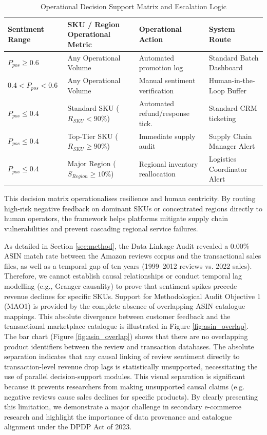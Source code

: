 \documentclass[authoryear,review,3p,times,12pt]{elsarticle}
\begin{document}
\begin{landscape}
\begin{table}
\centering
\renewcommand{\arraystretch}{1.15}
\caption{Operational Decision Support Matrix and Escalation Logic}
\label{tab:decision_matrix}
\begin{tabular}{llll}
\hline
\textbf{Sentiment Range} & \textbf{SKU / Region Operational Metric} & \textbf{Operational Action}     & \textbf{System Route}       \\ \hline
$P_{pos} \ge 0.6$     & Any Operational Volume          & Automated promotion log       & Standard Batch Dashboard   \\
$0.4 < P_{pos} < 0.6$ & Any Operational Volume          & Manual sentiment verification & Human-in-the-Loop Buffer   \\
$P_{pos} \le 0.4$         & Standard SKU ($R_{SKU} < 90\%$)       & Automated refund/response tick. & Standard CRM ticketing      \\
$P_{pos} \le 0.4$     & Top-Tier SKU ($R_{SKU} \ge 90\%$) & Immediate supply audit        & Supply Chain Manager Alert \\
$P_{pos} \le 0.4$         & Major Region ($S_{Region} \ge 10\%$)     & Regional inventory reallocation & Logistics Coordinator Alert \\ \hline
\end{tabular}
\end{table}
\end{landscape}

This decision matrix operationalises resilience and human centricity. By routing high-risk negative feedback on dominant SKUs or concentrated regions directly to human operators, the framework helps platforms mitigate supply chain vulnerabilities and prevent cascading regional service failures.

As detailed in Section \ref{sec:method}, the Data Linkage Audit revealed a $0.00\%$ ASIN match rate between the Amazon reviews corpus and the transactional sales files, as well as a temporal gap of ten years (1999–2012 reviews vs. 2022 sales). Therefore, we cannot establish causal relationships or conduct temporal lag modelling (e.g., Granger causality) to prove that sentiment spikes precede revenue declines for specific SKUs. Support for Methodological Audit Objective 1 (MAO1) is provided by the complete absence of overlapping ASIN catalogue mappings. This absolute divergence between customer feedback and the transactional marketplace catalogue is illustrated in Figure \ref{fig:asin_overlap}. The bar chart (Figure \ref{fig:asin_overlap}) shows that there are no overlapping product identifiers between the review and transaction databases. The absolute separation indicates that any causal linking of review sentiment directly to transaction-level revenue drop lags is statistically unsupported, necessitating the use of parallel decision-support modules. This visual separation is significant because it prevents researchers from making unsupported causal claims (e.g. negative reviews cause sales declines for specific products). By clearly presenting this limitation, we demonstrate a major challenge in secondary e-commerce research and highlight the importance of data provenance and catalogue alignment under the DPDP Act of 2023.
\end{document}
